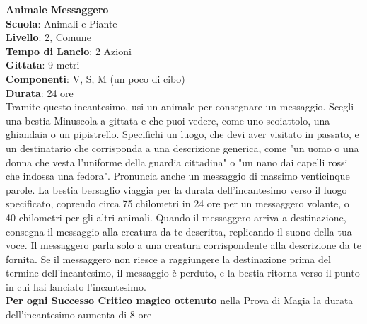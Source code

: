 \begin{multicols}{2}
\medskip\textbf{Animale Messaggero}\\
\textbf{Scuola}: Animali e Piante\\
\textbf{Livello}: 2, Comune\\
\textbf{Tempo di Lancio}: 2 Azioni\\
\textbf{Gittata}: 9 metri\\
\textbf{Componenti}: V, S, M (un poco di cibo)\\
\textbf{Durata}: 24 ore\\
Tramite questo incantesimo, usi un animale per consegnare un messaggio. Scegli una bestia Minuscola a gittata e che puoi vedere, come uno scoiattolo, una ghiandaia o un pipistrello. Specifichi un luogo, che devi aver visitato in passato, e un destinatario che corrisponda a una descrizione generica, come "un uomo o una donna che vesta l'uniforme della guardia cittadina" o "un nano dai capelli rossi che indossa una fedora". Pronuncia anche un messaggio di massimo venticinque parole. La bestia bersaglio viaggia per la durata dell'incantesimo verso il luogo specificato, coprendo circa 75 chilometri in 24 ore per un messaggero volante, o 40 chilometri per gli altri animali. Quando il messaggero arriva a destinazione, consegna il messaggio alla creatura da te descritta, replicando il suono della tua voce. Il messaggero parla solo a una creatura corrispondente alla descrizione da te fornita. Se il messaggero non riesce a raggiungere la destinazione prima del termine dell'incantesimo, il messaggio è perduto, e la bestia ritorna verso il punto in cui hai lanciato l'incantesimo.\\
\textbf{Per ogni Successo Critico magico ottenuto} nella Prova di Magia la durata dell'incantesimo aumenta di 8 ore


\end{multicols}
